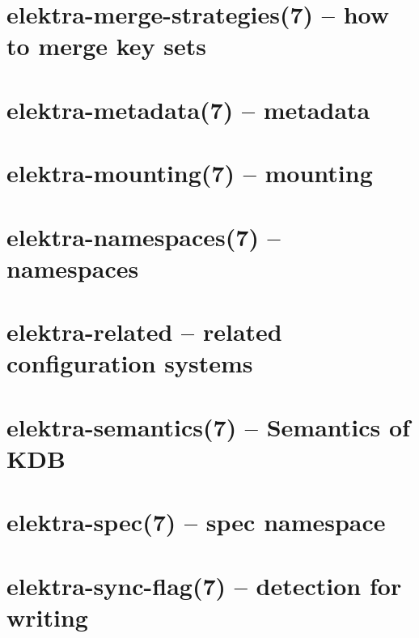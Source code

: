 \let\mypdfximage\pdfximage\def\pdfximage{\immediate\mypdfximage}\documentclass[twoside]{book}
\newcommand{\+}{\discretionary{\mbox{\scriptsize$\hookleftarrow$}}{}{}}
\begin{document}
\chapter{elektra-\/merge-\/strategies(7) -- how to merge key sets}
\label{doc_help_elektra-merge-strategy_md}

\chapter{elektra-\/metadata(7) -- metadata}
\label{doc_help_elektra-metadata_md}

\chapter{elektra-\/mounting(7) -- mounting}
\label{doc_help_elektra-mounting_md}

\chapter{elektra-\/namespaces(7) -- namespaces}
\label{doc_help_elektra-namespaces_md}

\chapter{elektra-\/related -- related configuration systems}
\label{doc_help_elektra-related_md}

\chapter{elektra-\/semantics(7) -- Semantics of KDB}
\label{doc_help_elektra-semantics_md}

\chapter{elektra-\/spec(7) -- spec namespace}
\label{doc_help_elektra-spec_md}

\chapter{elektra-\/sync-\/flag(7) -- detection for writing}
\label{doc_help_elektra-sync-flag_md}

\end{document}
